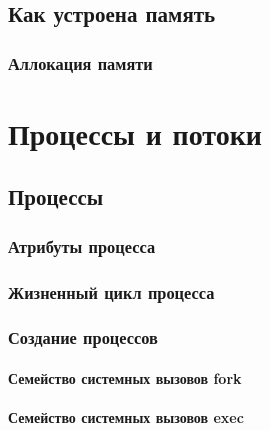 \documentclass[oneside]{book}
\begin{document}
	\chapter{Как устроена память}
	

		\section{Аллокация памяти}
		
	
	
\part{Процессы и потоки}
%	

	\chapter{Процессы}
	
	
		\section{Атрибуты процесса}
		

		\section{Жизненный цикл процесса}
		

		\section{Создание процессов}
		

			\subsection{Семейство системных вызовов fork}
			

			\subsection{Семейство системных вызовов exec}
			
\end{document}
